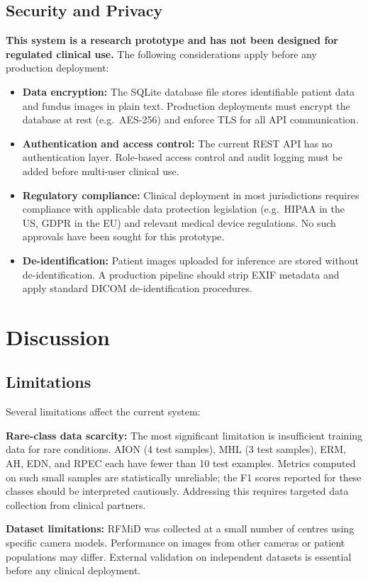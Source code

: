 \documentclass[conference]{IEEEtran}
\begin{document}
\subsection{Security and Privacy}
\textbf{This system is a research prototype and has not been designed for regulated clinical use.} The following considerations apply before any production deployment:
\begin{itemize}
    \item \textbf{Data encryption:} The SQLite database file stores identifiable patient data and fundus images in plain text. Production deployments must encrypt the database at rest (e.g.\ AES-256) and enforce TLS for all API communication.
    \item \textbf{Authentication and access control:} The current REST API has no authentication layer. Role-based access control and audit logging must be added before multi-user clinical use.
    \item \textbf{Regulatory compliance:} Clinical deployment in most jurisdictions requires compliance with applicable data protection legislation (e.g.\ HIPAA in the US, GDPR in the EU) and relevant medical device regulations. No such approvals have been sought for this prototype.
    \item \textbf{De-identification:} Patient images uploaded for inference are stored without de-identification. A production pipeline should strip EXIF metadata and apply standard DICOM de-identification procedures.
\end{itemize}


\section{Discussion}

\subsection{Limitations}
Several limitations affect the current system:

\textbf{Rare-class data scarcity:} The most significant limitation is insufficient training data for rare conditions. AION (4 test samples), MHL (3 test samples), ERM, AH, EDN, and RPEC each have fewer than 10 test examples. Metrics computed on such small samples are statistically unreliable; the F1 scores reported for these classes should be interpreted cautiously. Addressing this requires targeted data collection from clinical partners.

\textbf{Dataset limitations:} RFMiD was collected at a small number of centres using specific camera models. Performance on images from other cameras or patient populations may differ. External validation on independent datasets is essential before any clinical deployment.
\end{document}
